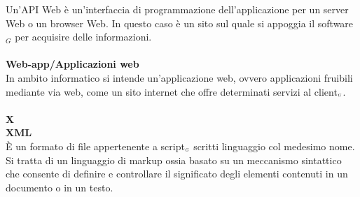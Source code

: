 Un'API Web è un'interfaccia di programmazione dell'applicazione per un server Web o un browser Web.
In questo caso è un sito sul quale si appoggia il software$_G$ per acquisire delle informazioni.\\
\\
\textbf{Web-app/Applicazioni web}\\
In ambito informatico si intende un'applicazione web, ovvero applicazioni fruibili mediante via web, come un sito internet che offre determinati servizi al client$_{\scaleto{G}{3pt}}$.\\
\\
\textbf{X}
\\
\textbf{XML}\\
È un formato di file appertenente a script$_{\scaleto{G}{3pt}}$ scritti linguaggio col medesimo nome.
Si tratta di un linguaggio di markup ossia basato su un meccanismo sintattico che consente di definire e controllare il significato degli elementi contenuti in un documento o in un testo.\\
\\

